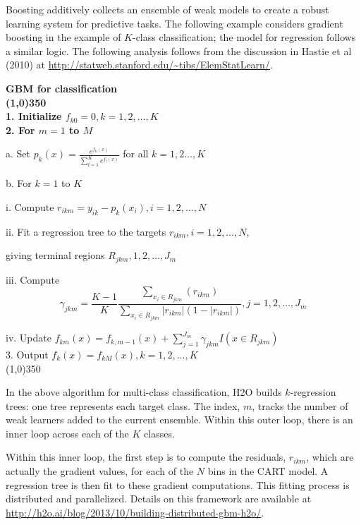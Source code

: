 Boosting additively collects an ensemble of weak models to create a robust 
learning system for predictive tasks. The following example considers gradient boosting in the example of $K$-class classification; the model for regression follows a similar logic. The following analysis follows from the discussion in
Hastie et al (2010) at {\url{http://statweb.stanford.edu/~tibs/ElemStatLearn/}}.

\bf{\footnotesize{GBM for classification}}
\normalfont
\\
\line(1,0){350}
\\
1. Initialize $f_{k0} = 0, k = 1,2,\dots,K$
\\
2. For $m=1$ to $M$

\hspace{1cm} a. Set $p_k(x) = \frac{e^{f_k(x)}}{\sum_{l=1}^K e^{f_l(x)}}$ for all $k = 1,2\dots, K$

\hspace{1cm} b. For $k=1$ to $K$

\hspace{2cm} i. Compute $r_{ikm} = y_{ik} - p_k(x_i),  i = 1,2,\dots,N$

\hspace{2cm} ii. Fit a regression tree to the targets $r_{ikm}, i = 1,2,\dots,N$,
\par \hspace{2.5cm} giving terminal regions $R_{jkm}, 1,2,\dots,J_m$

\hspace{2cm}iii. Compute $$\gamma_{jkm} = \frac{K-1}{K} \frac{\sum_{x_i \in R_{jkm}} (r_{ikm})}{\sum_{x_i \in R_{jkm}} |r_{ikm}| (1 - |r_{ikm}|)} , j=1,2,\dots,J_m$$

\hspace{2cm} iv. Update $f_{km}(x) = f_{k,m-1}(x) + \sum_{j=1}^{J_m} \gamma_{jkm} I(x \in R_{jkm})$
\\
3. Output $f_k^{\hat{}}(x) = f_{kM}(x),  k=1,2,\dots,K$
\\
\line(1,0){350}

In the above algorithm for multi-class classification, H2O builds $k$-regression trees: one tree represents each target class. The index, $m$, tracks the number of weak learners added to the current ensemble. Within this outer loop, there is an inner loop across each of the $K$ classes. 

\begin{minipage}{\textwidth}
Within this inner loop, the first step is to compute the residuals, $r_{ikm}$, which are actually the gradient values, for each of the $N$ bins in the CART model. A regression tree is then fit to these gradient computations. This fitting process is distributed and parallelized. Details on this framework are available at {\url{http://h2o.ai/blog/2013/10/building-distributed-gbm-h2o/}}.
\end{minipage}


